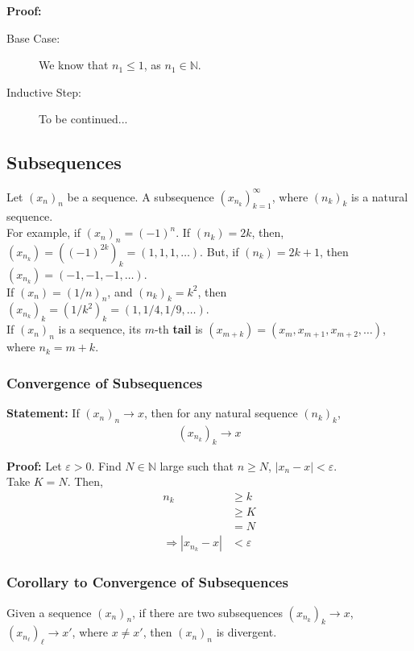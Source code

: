 \documentclass[10pt]{extarticle}
\newcommand{\N}{\mathbb{N}}
\begin{document}
    \textbf{Proof:}
      \begin{description}
        \item[Base Case:] We know that $n_1 \leq 1$, as $n_1\in\N$.
        \item[Inductive Step:] To be continued...
      \end{description}
  \subsection{Subsequences}%
    Let $(x_n)_n$ be a sequence. A subsequence $(x_{n_k})_{k=1}^{\infty}$, where $(n_k)_{k}$ is a natural sequence.\\

    For example, if $(x_n)_n = (-1)^n$. If $(n_k) = 2k$, then, $(x_{n_k}) = \left((-1)^{2k}\right)_k = (1,1,1,\dots)$. But, if $(n_k) = 2k+1$, then $(x_{n_k}) = (-1,-1,-1,\dots)$.\\

    If $(x_n) = (1/n)_n$, and $(n_k)_k = k^2$, then $(x_{n_k})_{k} = (1/k^2)_{k} = (1,1/4,1/9,\dots)$.\\

    If $(x_n)_n$ is a sequence, its $m$-th \textbf{tail} is $(x_{m+k}) = (x_m,x_{m+1},x_{m+2},\dots)$, where $n_k = m+k$.
    \subsubsection{Convergence of Subsequences}%
    \textbf{Statement:} If $(x_n)_n \rightarrow x$, then for any natural sequence $(n_k)_k$,
      \begin{align*}
        \left(x_{n_k}\right)_k \rightarrow x
      \end{align*}
      
      \textbf{Proof:} Let $\varepsilon > 0$. Find $N\in\N$ large such that $n \geq N$, $|x_{n} - x| < \varepsilon$.\\

      Take $K = N$. Then,
      \begin{align*}
        n_k &\geq k\\
        &\geq K\\
        &= N\\
        \Rightarrow |x_{n_k} - x| &< \varepsilon
      \end{align*}
      \subsubsection{Corollary to Convergence of Subsequences}%
    Given a sequence $(x_n)_n$, if there are two subsequences $(x_{n_k})_k \rightarrow x$, $(x_{n_\ell})_{\ell} \rightarrow x'$, where $x \neq x'$, then $(x_n)_n$ is divergent.\\
\end{document}

